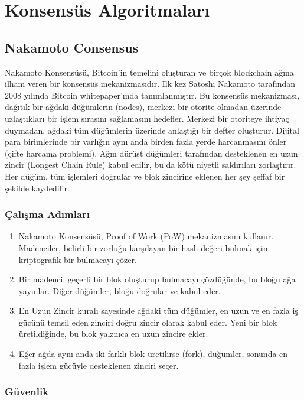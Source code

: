 \section{Konsensüs Algoritmaları}

\subsection{Nakamoto Consensus}

Nakamoto Konsensüsü, Bitcoin'in temelini oluşturan ve birçok blockchain ağına ilham veren bir konsensüs mekanizmasıdır. İlk kez Satoshi Nakamoto tarafından 2008 yılında Bitcoin whitepaper'ında tanımlanmıştır. Bu konsensüs mekanizması, dağıtık bir ağdaki düğümlerin (nodes), merkezi bir otorite olmadan üzerinde uzlaştıkları bir işlem sırasını sağlamasını hedefler. Merkezi bir otoriteye ihtiyaç duymadan, ağdaki tüm düğümlerin üzerinde anlaştığı bir defter oluşturur. Dijital para birimlerinde bir varlığın aynı anda birden fazla yerde harcanmasını önler (çifte harcama problemi). Ağın dürüst düğümleri tarafından desteklenen en uzun zincir (Longest Chain Rule) kabul edilir, bu da kötü niyetli saldırıları zorlaştırır. Her düğüm, tüm işlemleri doğrular ve blok zincirine eklenen her şey şeffaf bir şekilde kaydedilir.

\subsubsection{Çalışma Adımları}

\begin{enumerate}
    \item Nakamoto Konsensüsü, Proof of Work (PoW) mekanizmasını kullanır. Madenciler, belirli bir zorluğu karşılayan bir hash değeri bulmak için kriptografik bir bulmacayı çözer.
    \item Bir madenci, geçerli bir blok oluşturup bulmacayı çözdüğünde, bu bloğu ağa yayınlar. Diğer düğümler, bloğu doğrular ve kabul eder.
    \item En Uzun Zincir kuralı sayesinde ağdaki tüm düğümler, en uzun ve en fazla iş gücünü temsil eden zinciri doğru zincir olarak kabul eder. Yeni bir blok üretildiğinde, bu blok yalznıca en uzun zincire ekler.
    \item Eğer ağda aynı anda iki farklı blok üretilirse (fork), düğümler, sonunda en fazla işlem gücüyle desteklenen zinciri seçer.
\end{enumerate}

\subsubsection{Güvenlik}

